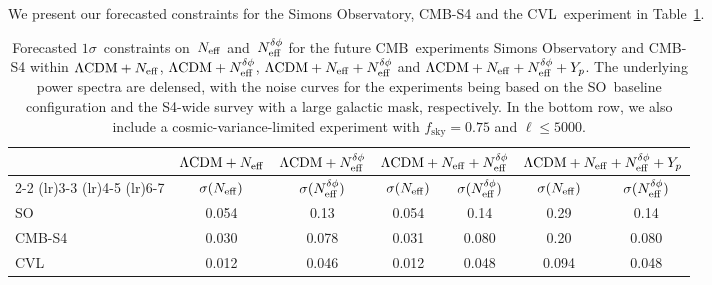 We present our forecasted constraints for the Simons Observatory, \mbox{CMB-S4} and the CVL~experiment in Table~\ref{ch12-tab:forecasts}.
\begin{table}
	\centering
	\small
	\setlength{\tabcolsep}{3.5pt}
	\begin{tabular}{l c c c c c c}
			\toprule
						& {$\Lambda\mathrm{CDM}+N_\mathrm{eff}$}	& {$\Lambda\mathrm{CDM}+N_\mathrm{eff}^{\delta\phi}$}	& \multicolumn{2}{c}{$\Lambda\mathrm{CDM}+N_\mathrm{eff}+N_\mathrm{eff}^{\delta\phi}$}	& \multicolumn{2}{c}{$\Lambda\mathrm{CDM}+N_\mathrm{eff}+N_\mathrm{eff}^{\delta\phi}+Y_p$}	\\
						  \cmidrule(lr){2-2}			  \cmidrule(lr){3-3}				  \cmidrule(lr){4-5}										  \cmidrule(lr){6-7}
						& {$\sigma(N_\mathrm{eff})$}				& {$\sigma(N_\mathrm{eff}^{\delta\phi})$}				& {$\sigma(N_\mathrm{eff})$}		& {$\sigma(N_\mathrm{eff}^{\delta\phi})$}				& {$\sigma(N_\mathrm{eff})$}		& {$\sigma(N_\mathrm{eff}^{\delta\phi})$}					\\
			\midrule[0.065em]
		SO				& 0.054							& 0.13								& 0.054					& 0.14								& 0.29					& 0.14									\\
		\mbox{CMB-S4}	& 0.030							& 0.078								& 0.031					& 0.080								& 0.20					& 0.080									\\
		CVL				& 0.012							& 0.046								& 0.012					& 0.048								& 0.094					& 0.048									\\
			\bottomrule
	\end{tabular}
	\caption[Forecasted constraints on the phase shift for future CMB experiments]{Forecasted $1\sigma$~constraints on~$N_\mathrm{eff}$ and~$N_\mathrm{eff}^{\delta\phi}$ for the future CMB~experiments Simons Observatory and \mbox{CMB-S4} within $\Lambda\mathrm{CDM} + N_\mathrm{eff}$, $\Lambda\mathrm{CDM} + N_\mathrm{eff}^{\delta\phi}$, $\Lambda\mathrm{CDM} + N_\mathrm{eff} + N_\mathrm{eff}^{\delta\phi}$ and $\Lambda\mathrm{CDM} + N_\mathrm{eff} + N_\mathrm{eff}^{\delta\phi} + Y_p$. The underlying power spectra are delensed, with the noise curves for the experiments being based on the SO~baseline configuration and the S4-wide survey with a large galactic mask, respectively. In the bottom row, we also include a cosmic-variance-limited experiment with $f_\mathrm{sky} = 0.75$ and $\ell \leq 5000$.}
	\label{ch12-tab:forecasts}
\end{table}
